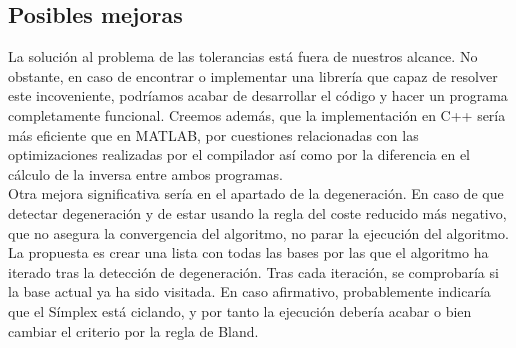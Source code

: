 \documentclass[12pt, titlepage]{article}
\begin{document}
\subsection{Posibles mejoras}
La solución al problema de las tolerancias está fuera de nuestros alcance. No obstante, en caso de encontrar o implementar una librería que capaz de resolver este incoveniente, podríamos acabar de desarrollar el código y hacer un programa completamente funcional. Creemos además, que la implementación en C++ sería más eficiente que en MATLAB, por cuestiones relacionadas con las optimizaciones realizadas por el compilador así como por la diferencia en el cálculo de la inversa entre ambos programas.\\
Otra mejora significativa sería en el apartado de la degeneración. En caso de que detectar degeneración y de estar usando la regla del coste reducido más negativo, que no asegura la convergencia del algoritmo, no parar la ejecución del algoritmo. La propuesta es crear una lista con todas las bases por las que el algoritmo ha iterado tras la detección de degeneración. Tras cada iteración, se comprobaría si la base actual ya ha sido visitada. En caso afirmativo, probablemente indicaría que el Símplex está ciclando, y por tanto la ejecución debería acabar o bien cambiar el criterio por la regla de Bland.
\newpage
\end{document}
